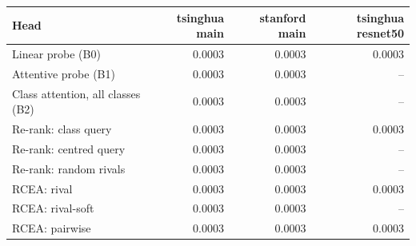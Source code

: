 \begin{tabular}{lrrr}
\toprule
Head & tsinghua main & stanford main & tsinghua resnet50 \\
\midrule
Linear probe (B0) & 0.0003 & 0.0003 & 0.0003 \\
Attentive probe (B1) & 0.0003 & 0.0003 & -- \\
Class attention, all classes (B2) & 0.0003 & 0.0003 & -- \\
Re-rank: class query & 0.0003 & 0.0003 & 0.0003 \\
Re-rank: centred query & 0.0003 & 0.0003 & -- \\
Re-rank: random rivals & 0.0003 & 0.0003 & -- \\
RCEA: rival & 0.0003 & 0.0003 & 0.0003 \\
RCEA: rival-soft & 0.0003 & 0.0003 & -- \\
RCEA: pairwise & 0.0003 & 0.0003 & 0.0003 \\
\bottomrule
\end{tabular}
